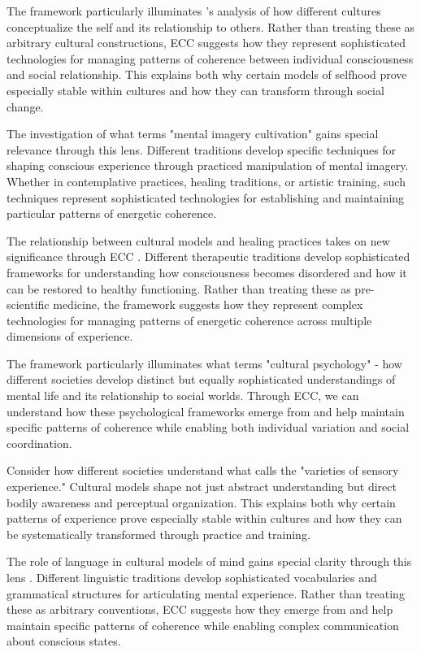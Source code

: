 The framework particularly illuminates \cite{myers1986pintupi}'s analysis of how different cultures conceptualize the self and its relationship to others. Rather than treating these as arbitrary cultural constructions, ECC suggests how they represent sophisticated technologies for managing patterns of coherence between individual consciousness and social relationship. This explains both why certain models of selfhood prove especially stable within cultures and how they can transform through social change.

The investigation of what \cite{noll1985mental} terms "mental imagery cultivation" gains special relevance through this lens. Different traditions develop specific techniques for shaping conscious experience through practiced manipulation of mental imagery. Whether in contemplative practices, healing traditions, or artistic training, such techniques represent sophisticated technologies for establishing and maintaining particular patterns of energetic coherence.

The relationship between cultural models and healing practices takes on new significance through ECC \cite{csordas1994sacred}. Different therapeutic traditions develop sophisticated frameworks for understanding how consciousness becomes disordered and how it can be restored to healthy functioning. Rather than treating these as pre-scientific medicine, the framework suggests how they represent complex technologies for managing patterns of energetic coherence across multiple dimensions of experience.

The framework particularly illuminates what \cite{shweder1991thinking} terms "cultural psychology" - how different societies develop distinct but equally sophisticated understandings of mental life and its relationship to social worlds. Through ECC, we can understand how these psychological frameworks emerge from and help maintain specific patterns of coherence while enabling both individual variation and social coordination.

Consider how different societies understand what \cite{desjarlais1992body} calls the "varieties of sensory experience." Cultural models shape not just abstract understanding but direct bodily awareness and perceptual organization. This explains both why certain patterns of experience prove especially stable within cultures and how they can be systematically transformed through practice and training.

The role of language in cultural models of mind gains special clarity through this lens \cite{roepstorff2008things}. Different linguistic traditions develop sophisticated vocabularies and grammatical structures for articulating mental experience. Rather than treating these as arbitrary conventions, ECC suggests how they emerge from and help maintain specific patterns of coherence while enabling complex communication about conscious states.

